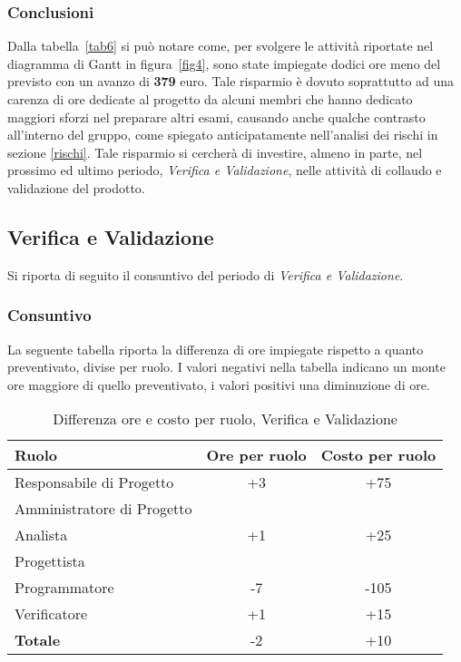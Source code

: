 \subsubsection{Conclusioni}
Dalla tabella~\ref{tab6} si può notare come, per svolgere le attività riportate nel diagramma di \gls{Gantt} in figura~\ref{fig4}, sono state impiegate dodici ore meno del previsto con un avanzo di \textbf{379} euro. Tale risparmio è dovuto soprattutto ad una carenza di ore dedicate al progetto da alcuni membri che hanno dedicato maggiori sforzi nel preparare altri esami, causando anche qualche contrasto all'interno del gruppo, come spiegato anticipatamente nell'analisi dei rischi in sezione \ref{rischi}. Tale risparmio si cercherà di investire, almeno in parte, nel prossimo ed ultimo periodo, \textit{Verifica e Validazione}, nelle attività di collaudo e validazione del prodotto. 

\newpage
\subsection{Verifica e Validazione}
Si riporta di seguito il consuntivo del periodo di \textit{Verifica e Validazione}.

\subsubsection{Consuntivo}
La seguente tabella riporta la differenza di ore impiegate rispetto a quanto preventivato, divise per ruolo. I valori negativi nella tabella indicano un monte ore maggiore di quello preventivato, i valori positivi una diminuzione di ore.

\begin{table}[h]
	\centering
	\begin{tabular}{|l|c|c|}
		\toprule
		\textbf{Ruolo} & \textbf{Ore per ruolo} & \textbf{Costo per ruolo} \\
		
		\midrule
		Responsabile di Progetto & +3 & +75 \\
		Amministratore di Progetto & & \\ 
		Analista & +1 & +25 \\
		Progettista & & \\
		Programmatore & -7 & -105 \\
		Verificatore & +1 & +15 \\
		\midrule
		\textbf{Totale} & -2 & +10 \\
		
		\bottomrule
	\end{tabular}
	\caption{Differenza ore e costo per ruolo, Verifica e Validazione}
	\label{tab7}
\end{table} 

